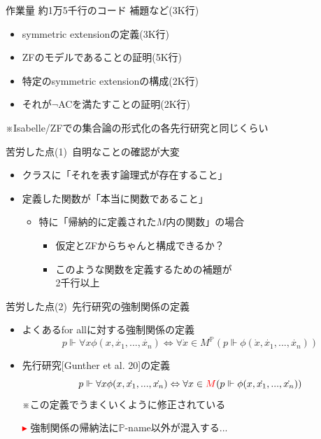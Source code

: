 \documentclass[17pt,aspectratio=169]{beamer}
\newcommand{\Pbb}{\mathbb{P}}
\begin{document}
\begin{frame}{作業量}
    約1万5千行のコード \hspace{0.6cm} {\small 補題など(3K行)}
    {\small
    \begin{itemize}[itemsep=8pt]
        \item symmetric extensionの定義(3K行)
        \item ZFのモデルであることの証明(5K行)
        \item 特定のsymmetric extensionの構成(2K行)
        \item それが$\neg$ACを満たすことの証明(2K行)
    \end{itemize} 

    ※Isabelle/ZFでの集合論の形式化の各先行研究と同じくらい
    }
\end{frame}

\begin{frame}{苦労した点(1)\, {\normalsize 自明なことの確認が大変}}
    \begin{itemize}[left=0cm]
        \item クラスに「それを表す論理式が存在すること」
        \item 定義した関数が「本当に関数であること」
        \vspace{5pt}
        {\small
        \begin{itemize}
            \item 特に「帰納的に定義された$M$内の関数」の場合
            \vspace{5pt}
            {\begin{itemize}[itemsep=5pt]
                \item 仮定とZFからちゃんと構成できるか？
                \item このような関数を定義するための補題が\\
                      2千行以上
            \end{itemize}}
        \end{itemize}
        }
    \end{itemize}
\end{frame}

\begin{frame}{苦労した点(2)\, {\normalsize 先行研究の強制関係の定義}}
    \begin{itemize}[itemsep=9pt]
        \item よくあるfor allに対する強制関係の定義
              $$ p \Vdash \forall x \phi(x, \dot{x_1}, ..., \dot{x_n}) \Leftrightarrow \forall \dot{x} \in M^\Pbb(p \Vdash \phi(\dot{x}, \dot{x_1}, ..., \dot{x_n})) $$
        \item 先行研究{\small [Gunther et al. 20]}の定義
              $$ p \Vdash \forall x \phi(x, \dot{x_1}, ..., \dot{x_n}) \Leftrightarrow \forall x \in \textcolor{red}{M}(p \Vdash \phi(x, \dot{x_1}, ..., \dot{x_n})) $$
              {\small 
                \hspace{0.5cm}※この定義でうまくいくように修正されている
              }
        \item [\textcolor{red}{$\blacktriangleright$}] 強制関係の帰納法に$\Pbb$-name以外が混入する...
    \end{itemize}
\end{frame}
\end{document}
